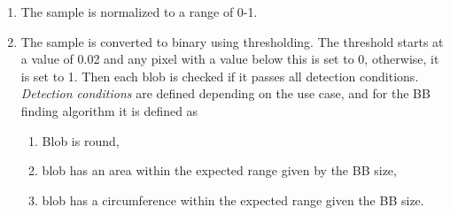 \begin{enumerate}
    \item The sample is normalized to a range of 0-1. 

    \item The sample is converted to binary using thresholding. The threshold starts at a value of 0.02 and any pixel with a value below this is set to 0, otherwise, it is set to 1. Then each blob is checked if it passes all detection conditions. \emph{Detection conditions} are defined depending on the use case, and for the BB finding algorithm it is defined as

    \begin{enumerate}
        \item Blob is round,
        \item blob has an area within the expected range given by the BB size,
        \item blob has a circumference within the expected range given the BB size.
    \end{enumerate}


\end{enumerate}
